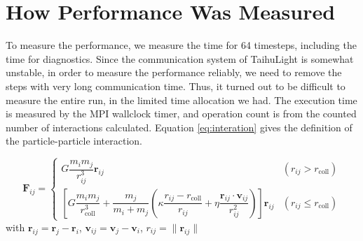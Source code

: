 \documentclass[sigconf]{acmart}
\begin{document}
  



\section{How Performance Was Measured}


To measure the performance, we measure the time for 64 timesteps,
including the time for  diagnostics. Since the communication system of
TaihuLight is somewhat unstable, in order to measure the performance
reliably, we need to remove the steps with very long communication
time. Thus, it turned out to be difficult to measure the entire run,
in the limited time allocation we had.
The
execution time is measured by the MPI wallclock timer, and operation
count is from the counted number of interactions
calculated. Equation \ref{eq:interation}  gives the definition of the
particle-particle interaction. 

\begin{equation}
  \bm F_{ij} = \begin{cases} G \dfrac{m_i m_j}
    {r_{ij}^3} \bm r_{ij} & \left(r_{ij} > r_\text{coll} \right)
    \\ \left[  G \dfrac{m_i m_j} {r_\text{coll}^3}  + \dfrac{m_j}{m_i
        + m_j} \left(      \kappa \dfrac{ r_{ij} -
        r_\text{coll}}{r_{ij}}    + \eta \dfrac{\bm r_{ij} \cdot \bm
        v_{ij}}{r_{ij}^2}    \right) \right] \bm r_{ij} & \left(
    r_{ij} \le r_\text{coll} \right) \end{cases}
  \label{eq:interation} 
\end{equation} with
$\bm r_{ij} = \bm r_j - \bm r_i$, $\bm v_{ij} = \bm v_j - \bm v_i$,
$r_{ij} = \| \bm r_{ij} \|$
\end{document}
